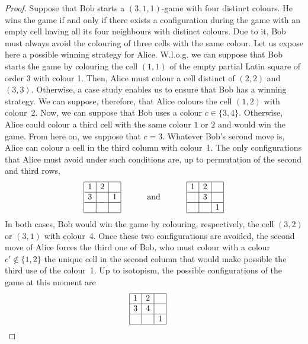 \documentclass{article}
\begin{document}
\begin{proof} Suppose that Bob starts a $(3,1,1)$-game with  four distinct colours. He wins the game if and only if there exists a configuration during the game with an empty cell having all its four neighbours with 
distinct colours. Due to it, Bob must always avoid the colouring  of three cells with the same colour. Let us expose here a possible winning strategy for Alice. W.l.o.g. we can suppose that Bob starts the game by 
colouring the cell $(1,1)$ of the empty partial Latin square of  order $3$ with colour 1. Then, Alice must colour a cell distinct of $(2,2)$ and $(3,3)$. Otherwise, a case study enables us to ensure that Bob has a 
winning strategy. We can suppose, therefore, that Alice colours  the cell $(1,2)$ with colour~2. Now, we can suppose that Bob uses a colour $c\in\{3,4\}$. Otherwise, Alice could colour a third cell with the same colour 
$1$ or $2$ and would win the game. From here on, we suppose that  $c=3$. Whatever Bob's second move is, Alice can colour a cell in the third column with colour~1. The only configurations that Alice must avoid under such 
conditions are, up to permutation of the second and third rows,
$$\begin{array}{|c|c|c|} \hline
1 & 2 & \ \\ \hline
3 & \ & 1 \\ \hline
\ & \ & \ \\ \hline
\end{array} \hspace{1cm}\text{ and } \hspace{1cm}
\begin{array}{|c|c|c|} \hline
1 & 2 & \ \\ \hline
\ & 3 & \ \\ \hline
\ & \ & 1 \\ \hline
\end{array}$$
In both cases, Bob would win the game by colouring, respectively, the cell $(3,2)$ or $(3,1)$ with colour~4. Once these two configurations are avoided, the second move of Alice forces the third one of Bob, who must colour with a colour $c'\not\in\{1,2\}$ the unique cell in the second column that would make possible the third use of the colour~1. Up to isotopism, the possible configurations of the game at this moment are
$$\begin{array}{|c|c|c|} \hline
1 & 2 & \ \\ \hline
3 & 4 & \ \\ \hline
\ & \ & 1 \\ \hline
\end{array} \hspace{0.5cm}
$$
\end{proof}
\end{document}
